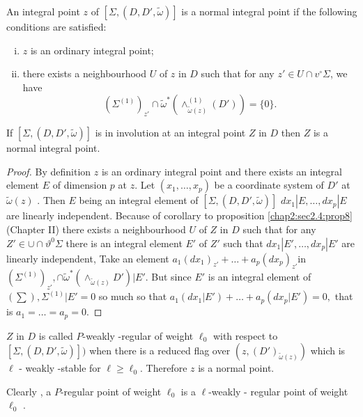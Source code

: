 \begin{defi*}
  An integral point $z$ of $[\Sigma,(D,D',\tilde\omega)] $ is a normal
  integral point if the following conditions are satisfied:  
\end{defi*}

\begin{enumerate}[(i)]
\item  $z$ is an ordinary integral point;
\item there exists a neighbourhood $U$  of $z $ in $ D$ such that  for
  any $z'\in U \cap v^\circ \Sigma $, we have  
  $$
  (\Sigma^{(1)})_{z'}\cap \tilde{\omega}^*
  (\wedge^{(1)}_{\tilde{\omega}(z)} (D')) = \{0\}. 
  $$
\end{enumerate}

\begin{proposition}\label{chap3:sec3.13:prop24}%
  If $[\Sigma,(D,D',\tilde\omega)]$ is in involution at an integral
  point $Z$ in $D$ then $Z$ is a normal integral point. 
\end{proposition}

\begin{proof}
  By definition $z$ is an ordinary integral point and there exists an
  integral element $E$ of dimension $p$ at $z$. Let $(x_1,\ldots,x_p)$
  be a coordinate system of $D'$ at $\tilde{\omega}(z)$ . Then $E$
  being an integral element of $[\Sigma,(D,D',\tilde\omega)]$ $dx_1
  |E,\ldots,dx_p| E $ are linearly independent. Because of corollary
  to proposition \ref{chap2:sec2.4:prop8} (Chapter II) there exists a neighbourhood $U$
  of $Z$ in $D$ such that for any $Z'\in \cup \cap \vartheta^0\Sigma $
  there is an integral element $E'$ of $Z'$ such that
  $dx_1|E',\ldots,dx_p|E'$ are linearly independent, Take an element $
  a_1 (dx_1)_{z'} + \ldots + a_p(dx_p)_{z'}$\pageoriginale in $(\Sigma^{(1)})_{z'},
  \cap \tilde{\omega}^* (\wedge_{\tilde\omega(z)}D') |E'$. But since
  $ E'$ is an integral element of $(\sum), \Sigma^{(1)}| E' = 0 $ so
  much so that $ a_1(dx_1|E') + \ldots + a_p(dx_p |E') = 0,$  that is
  $a_1 = \ldots= a_p = 0$.  
\end{proof}
 
\begin{defi*}
  $Z$ in $D$  is called $P$-weakly -regular of weight $\ell_0$ with
  respect to $[\Sigma,(D,D',\tilde\omega)])$  when there is a reduced
  flag over $(z,(D')_{\tilde{\omega} (z)}) $ which is $\ell $ - weakly
  -stable for $\ell\geq \ell_0$. Therefore $z$ is a normal point.  
  
  Clearly , a $P$-regular point of weight $\ell_0$ is a $\ell$-weakly
  - regular point of weight $\ell_0 $ . 
\end{defi*} 

